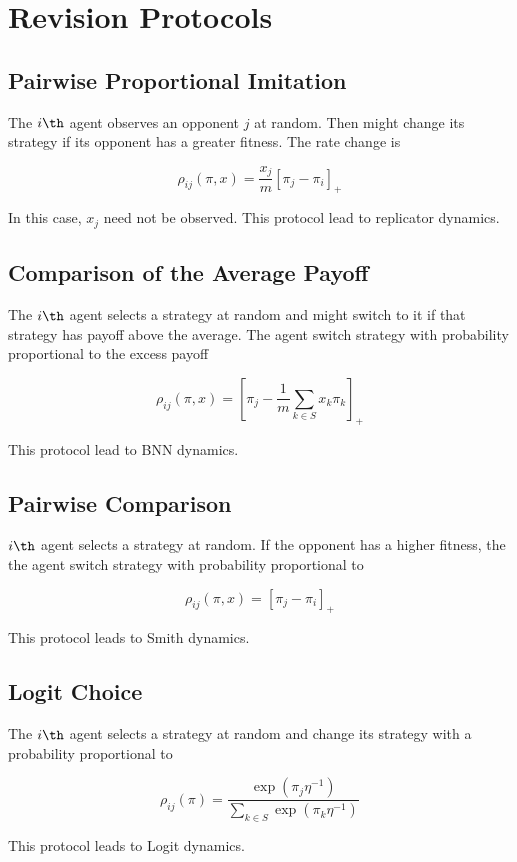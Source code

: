 

\section{Revision Protocols}


\subsection{Pairwise Proportional Imitation}

The $i\th$ agent observes an opponent $j$ at random. Then might change its strategy if  its opponent has a greater fitness. The rate change is 

\begin{equation}
\rho_{ij}(\pi, x) = \frac{x_j}{m} [\pi_j - \pi_i]_+
\end{equation}

In this case, $x_j$ need not be observed. This protocol lead to replicator dynamics.


	

\subsection{Comparison of the Average Payoff}

The $i\th$ agent selects a strategy at random and might switch to it if that strategy has payoff above the average. The agent switch strategy with probability proportional to the excess payoff

\begin{equation}
\rho_{ij}(\pi, x) = \left[ \pi_j - \frac{1}{m} \sum_{k\in S} x_k \pi_k \right]_+
\end{equation}

This protocol lead to BNN dynamics.

\subsection{Pairwise Comparison}

$i\th$ agent selects a strategy at random. If the opponent has a higher fitness, the the agent switch strategy with probability proportional to

\begin{equation}
\rho_{ij}(\pi, x) = \left[ \pi_j - \pi_i \right]_+
\end{equation}

This protocol leads to Smith dynamics.



\subsection{Logit Choice}

The $i\th$ agent selects a strategy at random and change its strategy with a probability proportional to 

\begin{equation}
\rho_{ij}(\pi) = \frac{ \exp(\pi_j \eta^{-1} ) }{ \sum_{k \in S} \exp(\pi_k \eta^{-1} ) }
\end{equation}

This protocol leads to Logit dynamics.





